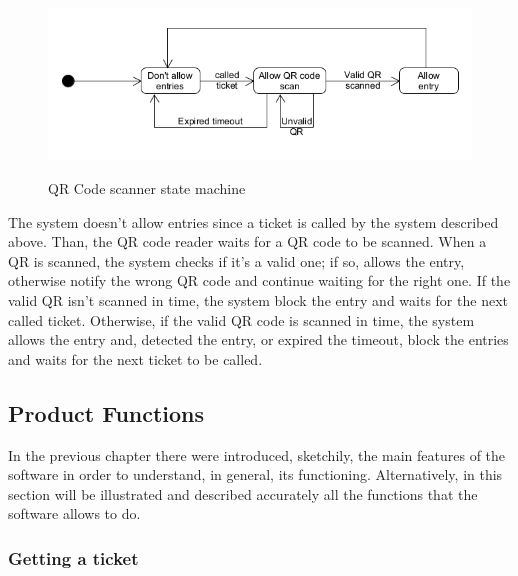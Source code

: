 \documentclass{article}
\begin{document}
		\bigskip
		
		\begin{figure}[!h]
			
			\centering
			\includegraphics[scale=0.52]{statechart2.PNG} \\
			\caption{QR Code scanner state machine}
			
		\end{figure}
		
		The system doesn't allow entries since a ticket is called by the system described above. Than, the QR code reader waits for a QR code to be scanned. When a QR is scanned, the system checks if it's a valid one; if so, allows the entry, otherwise notify the wrong QR code and continue waiting for the right one. If the valid QR isn't scanned in time, the system block the entry and waits for the next called ticket. Otherwise, if the valid QR code is scanned in time, the system allows the entry and, detected the entry, or expired the timeout, block the entries and waits for the next ticket to be called.
	
	\subsection{Product Functions}
		
	In the previous chapter there were introduced, sketchily, the main features of the software in order to understand, in general, its functioning. Alternatively, in this section will be illustrated and described accurately all the functions that the software allows to do.
	
		\subsubsection{Getting a ticket}
		
\end{document}
